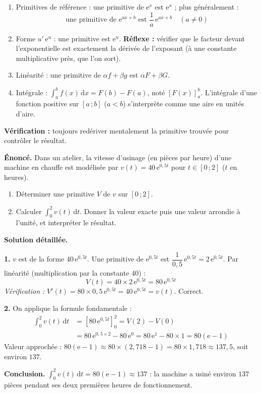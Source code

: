 \documentclass[11pt]{article}
\newcommand{\cle}[1]{{\popxbold\color{popdark}#1}}
\begin{document}
\begin{methode}
\begin{enumerate}
\item Primitives de référence : une primitive de $\mathrm{e}^x$ est $\mathrm{e}^x$ ; plus généralement :
\[ \text{une primitive de } \mathrm{e}^{ax+b} \text{ est } \dfrac{1}{a}\,\mathrm{e}^{ax+b} \quad (a \neq 0) \]
\item Forme $u'\,\mathrm{e}^{u}$ : une primitive est $\mathrm{e}^{u}$. \textbf{Réflexe :} vérifier que le facteur devant l'exponentielle est exactement la dérivée de l'exposant (à une constante multiplicative près, que l'on sort).
\item Linéarité : une primitive de $\alpha f + \beta g$ est $\alpha F + \beta G$.
\item Intégrale : $\displaystyle\int_{a}^{b} f(x)\,\mathrm{d}x = F(b) - F(a)$, noté $[F(x)]_a^b$. L'intégrale d'une fonction positive sur $[a\,;b]$ ($a<b$) s'interprète comme une \cle{aire} en unités d'aire.
\end{enumerate}
\textbf{Vérification :} toujours redériver mentalement la primitive trouvée pour contrôler le résultat.
\end{methode}

\begin{exoresolu}
\textbf{Énoncé.} Dans un atelier, la vitesse d'usinage (en pièces par heure) d'une machine en chauffe est modélisée par $v(t) = 40\,\mathrm{e}^{0{,}5t}$ pour $t \in [0\,;2]$ ($t$ en heures).
\begin{enumerate}
\item Déterminer une primitive $V$ de $v$ sur $[0\,;2]$.
\item Calculer $\displaystyle\int_{0}^{2} v(t)\,\mathrm{d}t$. Donner la valeur exacte puis une valeur arrondie à l'unité, et interpréter le résultat.
\end{enumerate}
\tcblower
\textbf{Solution détaillée.}

\textbf{1.} $v$ est de la forme $40\,\mathrm{e}^{0{,}5t}$. Une primitive de $\mathrm{e}^{0{,}5t}$ est $\dfrac{1}{0{,}5}\,\mathrm{e}^{0{,}5t} = 2\,\mathrm{e}^{0{,}5t}$. Par linéarité (multiplication par la constante $40$) :
\[ V(t) = 40 \times 2\,\mathrm{e}^{0{,}5t} = 80\,\mathrm{e}^{0{,}5t} \]
\emph{Vérification :} $V'(t) = 80 \times 0{,}5\,\mathrm{e}^{0{,}5t} = 40\,\mathrm{e}^{0{,}5t} = v(t)$. Correct.

\textbf{2.} On applique la formule fondamentale :
\begin{align*}
\int_{0}^{2} v(t)\,\mathrm{d}t &= \left[80\,\mathrm{e}^{0{,}5t}\right]_{0}^{2} = V(2) - V(0) \\
&= 80\,\mathrm{e}^{0{,}5 \times 2} - 80\,\mathrm{e}^{0} = 80\,\mathrm{e}^{1} - 80 \times 1 = 80(\mathrm{e} - 1)
\end{align*}
Valeur approchée : $80(\mathrm{e}-1) \approx 80 \times (2{,}718 - 1) = 80 \times 1{,}718 \approx 137{,}5$, soit environ $137$.

\textbf{Conclusion.} $\displaystyle\int_{0}^{2} v(t)\,\mathrm{d}t = 80(\mathrm{e}-1) \approx 137$ : la machine a usiné environ $137$ pièces pendant ses deux premières heures de fonctionnement.
\end{exoresolu}
\end{document}
